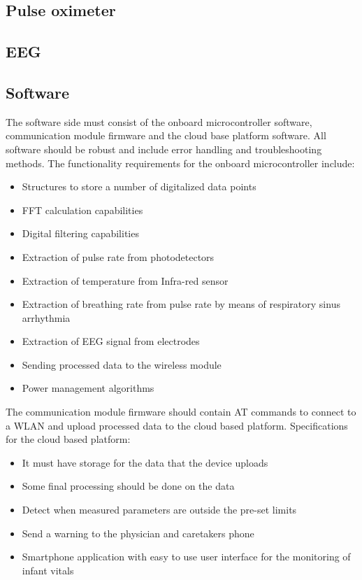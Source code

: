 \subsection{Pulse oximeter}


\subsection{EEG}


\subsection{Software}
The software side must consist of the onboard microcontroller software, communication module firmware and the cloud base platform software. All software should be robust and include error handling and troubleshooting methods.  The functionality requirements for the onboard microcontroller include:
\begin{itemize}
  \item Structures to store a number of digitalized data points
  \item FFT calculation capabilities
  \item Digital filtering capabilities
  \item Extraction of pulse rate from photodetectors
  \item Extraction of temperature from Infra-red sensor
  \item Extraction of breathing rate from pulse rate by means of respiratory sinus arrhythmia
  \item Extraction of EEG signal from electrodes
  \item Sending processed data to the wireless module
  \item Power management algorithms
\end{itemize}

The communication module firmware should contain AT commands to connect to a WLAN and upload processed data to the cloud based platform. Specifications for the cloud based platform:
\begin{itemize}
  \item It must have storage for the data that the device uploads
  \item Some final processing should be done on the data
  \item Detect when measured parameters are outside the pre-set limits
  \item Send a warning to the physician and caretakers phone
  \item Smartphone application with easy to use user interface for the monitoring of infant vitals
\end{itemize}

